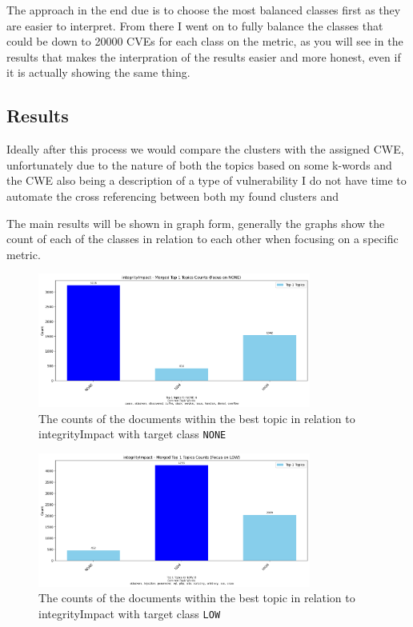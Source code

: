 \documentclass[12pt]{article}
\begin{document}
The approach in the end due is to
choose the most balanced classes first as they are easier to interpret. From there I went on to
fully balance the classes that could be down to 20000 CVEs for each class on the metric, as you will
see in the results that makes the interpration of the results easier and more honest, even if it is
actually showing the same thing.

\subsection{Results}
Ideally after this process we would compare the clusters with the assigned CWE, unfortunately due to the
nature of both the topics based on some k-words and the CWE also being a description of a type of
vulnerability I do not have time to automate the cross referencing between both my found clusters
and

The main results will be shown in graph form, generally the graphs show the count of each of the
classes in relation to each other when focusing on a specific metric.

\begin{figure}[h] \centering
	\includegraphics[width=0.8\textwidth]{figures/integrityImpact/merged_top_k_topics_category_focus_counts_integrityImpact_NONE_k1.png}
	\caption{\label{fig:integrityImpact_20_NONE}The counts of the documents within the best topic in
		relation to integrityImpact with target class \texttt{NONE}}
\end{figure}

\begin{figure}[h] \centering
	\includegraphics[width=0.8\textwidth]{figures/integrityImpact/merged_top_k_topics_category_focus_counts_integrityImpact_LOW_k1.png}
	\caption{\label{fig:integrityImpact_20_LOW}The counts of the documents within the best topic in
		relation to integrityImpact with target class \texttt{LOW}}
\end{figure}
\end{document}
